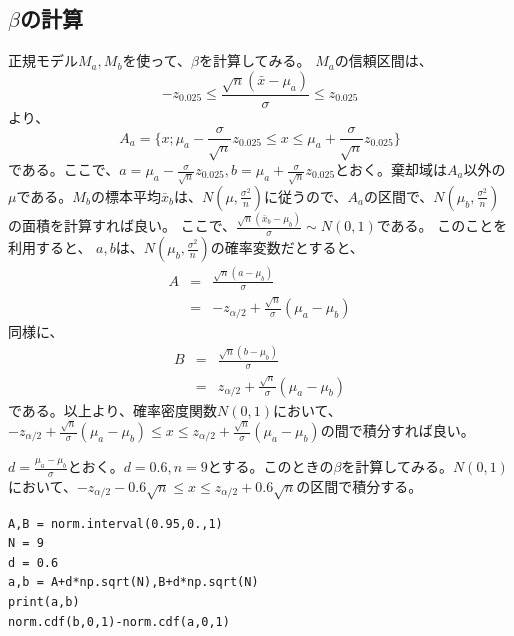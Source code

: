 \subsection{$\beta$の計算}
正規モデル$M_a,M_b$を使って、$\beta$を計算してみる。
$M_a$の信頼区間は、
\begin{equation*}
    -z_{0.025}\leq \frac{\sqrt{n}(\bar{x}-\mu_a)}{\sigma}\leq z_{0.025}
\end{equation*}
より、
\begin{equation*}
    A_a = \{ x ; \mu_a -\frac{\sigma}{\sqrt{n}}z_{0.025} \leq x \leq \mu_a +\frac{\sigma}{\sqrt{n}}z_{0.025} \}
\end{equation*}
である。ここで、$a=\mu_a -\frac{\sigma}{\sqrt{n}}z_{0.025},b = \mu_a +\frac{\sigma}{\sqrt{n}}z_{0.025} $とおく。棄却域は$A_a$以外の$\mu$である。$M_b$の標本平均$\bar{x}_b$は、$N(\mu,\frac{\sigma^2}{n})$に従うので、$A_a$の区間で、$N(\mu_b,\frac{\sigma^2}{n})$の面積を計算すれば良い。
ここで、$\frac{\sqrt{n}(\bar{x}_b-\mu_b)}{\sigma}\sim N(0,1)$である。
このことを利用すると、
$a,b$は、$N(\mu_b,\frac{\sigma^2}{n})$の確率変数だとすると、
\begin{eqnarray*}
    A &=& \frac{\sqrt{n}(a-\mu_b)}{\sigma} \\
    &=& -z_{\alpha/2}+\frac{\sqrt{n}}{\sigma}(\mu_a-\mu_b)
\end{eqnarray*}
同様に、
\begin{eqnarray*}
    B &=& \frac{\sqrt{n}(b-\mu_b)}{\sigma} \\
    &=& z_{\alpha/2}+\frac{\sqrt{n}}{\sigma}(\mu_a-\mu_b)
\end{eqnarray*}
である。以上より、確率密度関数$N(0,1)$において、$-z_{\alpha/2}+\frac{\sqrt{n}}{\sigma}(\mu_a-\mu_b) \leq x\leq  z_{\alpha/2}+\frac{\sqrt{n}}{\sigma}(\mu_a-\mu_b)$の間で積分すれば良い。

$d=\frac{\mu_a-\mu_b}{\sigma}$とおく。$d=0.6,n=9$とする。このときの$\beta$を計算してみる。$N(0,1)$において、$-z_{\alpha/2} -0.6\sqrt{n} \leq x \leq z_{\alpha/2} +0.6\sqrt{n}$の区間で積分する。

\begin{lstlisting}
A,B = norm.interval(0.95,0.,1)
N = 9
d = 0.6
a,b = A+d*np.sqrt(N),B+d*np.sqrt(N)
print(a,b)
norm.cdf(b,0,1)-norm.cdf(a,0,1)
\end{lstlisting}

